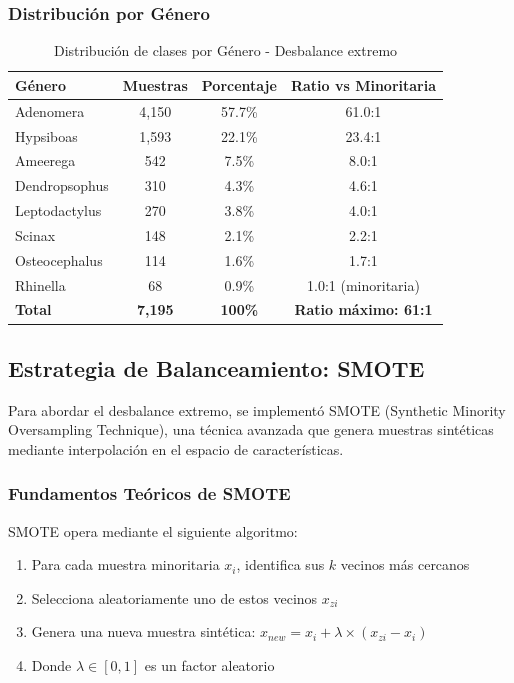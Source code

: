 \documentclass[12pt,a4paper]{article}
\begin{document}
\subsubsection{Distribución por Género}
\begin{table}[H]
\centering
\begin{tabular}{|l|c|c|c|}
\hline
\textbf{Género} & \textbf{Muestras} & \textbf{Porcentaje} & \textbf{Ratio vs Minoritaria} \\
\hline
Adenomera & 4,150 & 57.7\% & 61.0:1 \\
Hypsiboas & 1,593 & 22.1\% & 23.4:1 \\
Ameerega & 542 & 7.5\% & 8.0:1 \\
Dendropsophus & 310 & 4.3\% & 4.6:1 \\
Leptodactylus & 270 & 3.8\% & 4.0:1 \\
Scinax & 148 & 2.1\% & 2.2:1 \\
Osteocephalus & 114 & 1.6\% & 1.7:1 \\
Rhinella & 68 & 0.9\% & 1.0:1 (minoritaria) \\
\hline
\textbf{Total} & \textbf{7,195} & \textbf{100\%} & \textbf{Ratio máximo: 61:1} \\
\hline
\end{tabular}
\caption{Distribución de clases por Género - Desbalance extremo}
\end{table}

\subsection{Estrategia de Balanceamiento: SMOTE}
Para abordar el desbalance extremo, se implementó SMOTE (Synthetic Minority Oversampling Technique), una técnica avanzada que genera muestras sintéticas mediante interpolación en el espacio de características.

\subsubsection{Fundamentos Teóricos de SMOTE}
SMOTE opera mediante el siguiente algoritmo:
\begin{enumerate}
    \item Para cada muestra minoritaria $x_i$, identifica sus $k$ vecinos más cercanos
    \item Selecciona aleatoriamente uno de estos vecinos $x_{zi}$
    \item Genera una nueva muestra sintética: $x_{new} = x_i + \lambda \times (x_{zi} - x_i)$
    \item Donde $\lambda \in [0,1]$ es un factor aleatorio
\end{enumerate}
\end{document}
